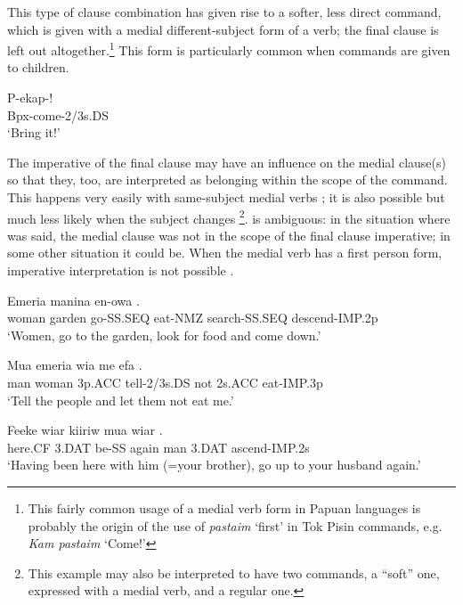 This type of clause combination has given rise to a softer, less direct command, which is given with a medial different-subject form of a verb; the final clause is left out altogether.\footnote{This fairly common usage of a medial verb form in Papuan languages is probably the origin of the use of \textit{pastaim} `first' in Tok Pisin commands, e.g. \textit{Kam pastaim} `Come!'}  This form is particularly common when commands are given to children. 

\ea%
\label{ex:x1084}
\gll P-ekap-! \\
Bpx-come-2/3s.DS      \\
\glt `Bring it!'
\z

The imperative of the final clause may have an influence on the medial clause(s) so that they, too, are interpreted as belonging within the scope of the command. This happens very easily with same-subject medial verbs ; it is also possible but much less likely when the subject changes \footnote{This example may also be interpreted to have two commands, a ``soft'' one, expressed with a medial verb, and a regular one.}.  is ambiguous: in the situation where was said, the medial clause was not in the scope of the final clause imperative; in some other situation it could be. When the medial verb has a first person form, imperative interpretation is not possible . 

\ea%
\label{ex:x1082}
\gll Emeria  manina    en-owa    . \\
woman  garden  go-SS.SEQ  eat-NMZ  search-SS.SEQ  descend-IMP.2p      \\
\glt `Women, go to the garden, look for food and come down.'
\z





\ea%
\label{ex:x1364}
\gll Mua  emeria  wia    me  efa  . \\
man  woman  3p.ACC  tell-2/3s.DS  not  2s.ACC  eat-IMP.3p      \\
\glt `Tell the people and let them not eat me.'
\z





\ea%
\label{ex:x1846}
\gll Feeke  wiar    kiiriw  mua  wiar  . \\
here.CF  3.DAT  be-SS  again  man  3.DAT  ascend-IMP.2s      \\
\glt `Having been here with him (=your brother), go up to your husband again.'
\z





